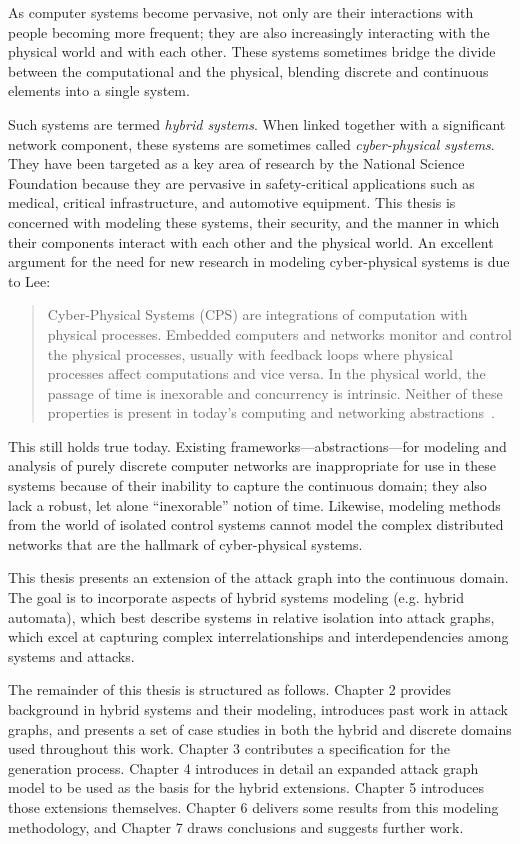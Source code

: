 As computer systems become pervasive, not only are 
their interactions with people becoming more frequent; they are also
increasingly interacting with the physical world and with each other. These
systems sometimes bridge the divide between the computational and the physical,
blending discrete and continuous elements into a single system.

Such systems are termed \emph{hybrid systems}. When linked together with a 
significant network component, these systems are sometimes called
\emph{cyber-physical systems}. They have been targeted as a key area of 
research by the National Science Foundation because they are pervasive in 
safety-critical applications such as medical, critical infrastructure, and
automotive equipment. This thesis is concerned with modeling
these systems, their security, and the manner in which their components
interact with each other and the physical world.
An excellent argument for the need for new research in modeling cyber-physical 
systems is due to Lee:
\begin{quote}
Cyber-Physical Systems (CPS) are integrations of computation with physical
processes. Embedded computers and networks monitor and control the physical
processes, usually with feedback loops where physical processes affect computations 
and vice versa. In the physical world, the passage of time is inexorable
and concurrency is intrinsic. Neither of these properties is present in today's
computing and networking abstractions~\cite{lee2006cyber}.
\end{quote}

This still holds true today. Existing frameworks---abstractions---for modeling 
and analysis of purely discrete computer networks are inappropriate for use in
these systems because of their inability to capture the continuous domain; they
also lack a robust, let alone ``inexorable'' notion of time. Likewise, 
modeling methods from the world of isolated control systems cannot model the
complex distributed networks that are the hallmark of cyber-physical systems.

This thesis presents an extension of the attack graph into the 
continuous domain. 
The goal is to incorporate aspects of hybrid systems
modeling (e.g. hybrid automata), which best describe systems in 
relative isolation into attack graphs, which excel at capturing complex 
interrelationships and interdependencies among systems and attacks.

The remainder of this thesis is structured as follows. Chapter 2 provides 
background in hybrid systems and their modeling, introduces past work in attack 
graphs, and presents a set of case studies in both the hybrid and discrete 
domains used throughout this work. Chapter 3 contributes a specification for 
the generation process. Chapter 4 introduces in detail an expanded attack graph 
model to be used as the basis for the hybrid extensions. Chapter 5
introduces those extensions themselves. Chapter 6 delivers some results from 
this modeling methodology, and Chapter 7 draws conclusions and suggests 
further work.
